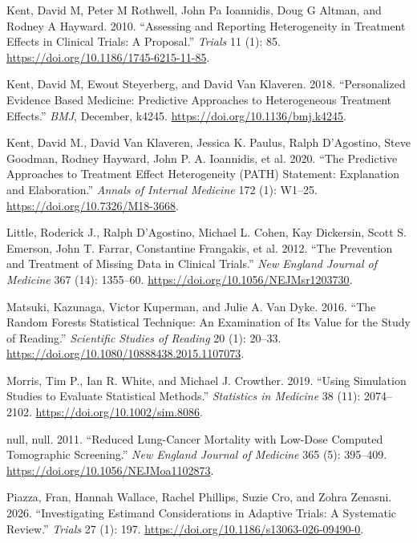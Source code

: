 \documentclass{article}
\newlength{\cslhangindent}
\newenvironment{CSLReferences}[2] %
 {\begin{list}{}{%
  \setlength{\itemindent}{0pt}
  \setlength{\leftmargin}{0pt}
  \setlength{\parsep}{0pt}
  \ifodd #1
   \setlength{\leftmargin}{\cslhangindent}
   \setlength{\itemindent}{-1\cslhangindent}
  \fi
  \setlength{\itemsep}{#2\baselineskip}}}
 {\end{list}}
\begin{document}
\begin{CSLReferences}{1}{0}
Kent, David M, Peter M Rothwell, John Pa Ioannidis, Doug G Altman, and
Rodney A Hayward. 2010. {``Assessing and Reporting Heterogeneity in
Treatment Effects in Clinical Trials: A Proposal.''} \emph{Trials} 11
(1): 85. \url{https://doi.org/10.1186/1745-6215-11-85}.

Kent, David M, Ewout Steyerberg, and David Van Klaveren. 2018.
{``Personalized Evidence Based Medicine: Predictive Approaches to
Heterogeneous Treatment Effects.''} \emph{BMJ}, December, k4245.
\url{https://doi.org/10.1136/bmj.k4245}.

Kent, David M., David Van Klaveren, Jessica K. Paulus, Ralph D'Agostino,
Steve Goodman, Rodney Hayward, John P. A. Ioannidis, et al. 2020. {``The
{Predictive} {Approaches} to {Treatment} Effect {Heterogeneity} ({PATH})
{Statement}: {Explanation} and {Elaboration}.''} \emph{Annals of
Internal Medicine} 172 (1): W1--25.
\url{https://doi.org/10.7326/M18-3668}.

Little, Roderick J., Ralph D'Agostino, Michael L. Cohen, Kay Dickersin,
Scott S. Emerson, John T. Farrar, Constantine Frangakis, et al. 2012.
{``The Prevention and Treatment of Missing Data in Clinical Trials.''}
\emph{New England Journal of Medicine} 367 (14): 1355--60.
\url{https://doi.org/10.1056/NEJMsr1203730}.

Matsuki, Kazunaga, Victor Kuperman, and Julie A. Van Dyke. 2016. {``The
{Random Forests} Statistical Technique: {An} Examination of Its Value
for the Study of Reading.''} \emph{Scientific Studies of Reading} 20
(1): 20--33. \url{https://doi.org/10.1080/10888438.2015.1107073}.

Morris, Tim P., Ian R. White, and Michael J. Crowther. 2019. {``Using
Simulation Studies to Evaluate Statistical Methods.''} \emph{Statistics
in Medicine} 38 (11): 2074--2102.
\url{https://doi.org/10.1002/sim.8086}.

null, null. 2011. {``Reduced Lung-Cancer Mortality with Low-Dose
Computed Tomographic Screening.''} \emph{New England Journal of
Medicine} 365 (5): 395--409.
\url{https://doi.org/10.1056/NEJMoa1102873}.

Piazza, Fran, Hannah Wallace, Rachel Phillips, Suzie Cro, and Zohra
Zenasni. 2026. {``Investigating Estimand Considerations in Adaptive
Trials: A Systematic Review.''} \emph{Trials} 27 (1): 197.
\url{https://doi.org/10.1186/s13063-026-09490-0}.


\end{CSLReferences}
\end{document}
